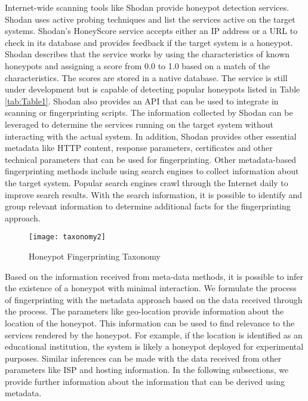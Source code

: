 Internet-wide scanning tools like Shodan provide honeypot detection services. Shodan uses active probing techniques and list the services active on the target systems. Shodan's  HoneyScore service accepts either an IP address or a URL to check in its database and provides feedback if the target system is a honeypot. Shodan describes that the service works by using the characteristics of known honeypots and assigning a score from 0.0 to 1.0 based on a match of the characteristics. The scores are stored in a native database. The service is still under development but is capable of detecting popular honeypots listed in Table \ref{tab:Table1}. Shodan also provides an API that can be used to integrate in scanning or fingerprinting scripts. The information collected by Shodan can be leveraged to determine the services running on the target system without interacting with the actual system. In addition, Shodan provides other essential metadata like HTTP content, response parameters, certificates and other technical parameters that can be used for fingerprinting. Other metadata-based fingerprinting methods include using search engines to collect information about the target system. Popular search engines crawl through the Internet daily to improve search results. With the search information, it is possible to identify and group relevant information to determine additional facts for the fingerprinting approach. 

\begin{figure}
    \centering
    \texttt{[image: taxonomy2]}
    \caption{Honeypot Fingerprinting Taxonomy}
    \label{fig:taxonomy}
\end{figure}



Based on the information received from meta-data methods, it is possible to infer the existence of a honeypot with minimal interaction. We formulate the process of fingerprinting with the metadata approach based on the data received through the process. The parameters like geo-location provide information about the location of the honeypot. This information can be used to find relevance to the services rendered by the honeypot. For example, if the location is identified as an educational institution, the system is likely a honeypot deployed for experimental purposes. Similar inferences can be made with the data received from other parameters like ISP and hosting information. In the following subsections, we provide further information about the information that can be derived using metadata. 


